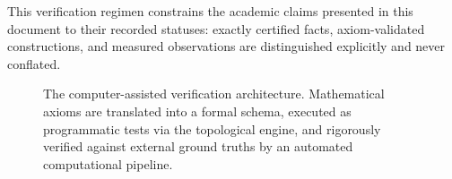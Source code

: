 This verification regimen constrains the academic claims presented in this document to their recorded statuses: exactly certified facts, axiom-validated constructions, and measured observations are distinguished explicitly and never conflated.

\begin{figure}[h]
\centering
{}
\caption{The computer-assisted verification architecture. Mathematical axioms are translated into a formal schema, executed as programmatic tests via the topological engine, and rigorously verified against external ground truths by an automated computational pipeline.}
\label{fig:verification}
\end{figure}
